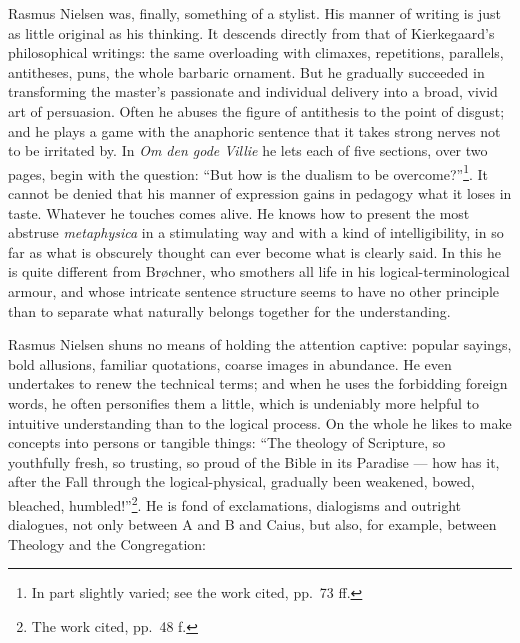 \documentclass[12pt,a4paper,openany]{book}
\begin{document}
Rasmus Nielsen was, finally, something of a stylist. His manner of writing is just as little original as his
thinking. It descends directly from that of Kierkegaard's philosophical writings: the same overloading with climaxes,
repetitions, parallels, antitheses, puns, the whole barbaric ornament. But he gradually succeeded in transforming
the master's passionate and individual delivery into a broad, vivid art of persuasion. Often he abuses the figure of
antithesis to the point of disgust; and he plays a game with the anaphoric sentence that it takes strong nerves not
to be irritated by. In \textit{Om den gode Villie} he lets each of five sections, over two pages, begin with the
question: ``But how is the dualism to be overcome?''\footnote{In part slightly varied; see the work cited, pp.~73 ff.}.
It cannot be denied that his manner of expression gains in pedagogy what it loses in taste. Whatever he touches
comes alive. He knows how to present the most abstruse \textit{metaphysica} in a stimulating way and with a kind of
intelligibility, in so far as what is obscurely thought can ever become what is clearly said. In this he is quite
different from Brøchner, who smothers all life in his logical-terminological armour, and whose intricate sentence
structure seems to have no other principle than to separate what naturally belongs together for the understanding.

Rasmus Nielsen shuns no means of holding the attention captive: popular sayings, bold allusions, familiar
quotations, coarse images in abundance. He even undertakes to renew the technical terms; and when he uses the
forbidding foreign words, he often personifies them a little, which is undeniably more helpful to intuitive
understanding than to the logical process. On the whole he likes to make concepts into persons or tangible things:
``The theology of Scripture, so youthfully fresh, so trusting, so proud of the Bible in its Paradise --- how has it,
after the Fall through the logical-physical, gradually been weakened, bowed, bleached, humbled!''\footnote{The work cited, pp.~48 f.}.
He is fond of exclamations, dialogisms and outright dialogues, not only between A and B and Caius, but also, for
example, between Theology and the Congregation:

\medskip
\end{document}
